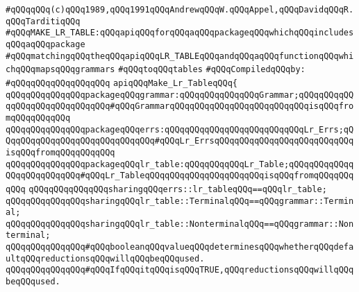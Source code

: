 \label{src/app/yacc/src/make-lr-table.api}
\verb|#qQQqqQQq(c)qQQq1989,qQQq1991qQQqAndrewqQQqW.qQQqAppel,qQQqDavidqQQqR.qQQqTarditiqQQq|\newline
\verb|#qQQqMAKE_LR_TABLE:qQQqapiqQQqforqQQqaqQQqpackageqQQqwhichqQQqincludesqQQqaqQQqpackage|\newline
\verb|#qQQqmatchingqQQqtheqQQqapiqQQqLR_TABLEqQQqandqQQqaqQQqfunctionqQQqwhichqQQqmapsqQQqgrammars|\newline
\verb|#qQQqtoqQQqtables|\newline
\newline
\verb|#qQQqCompiledqQQqby:|\newline
\verb|#qQQqqQQqqQQqqQQqqQQq|\newline
\newline
\verb|apiqQQqMake_Lr_TableqQQq{|\newline
\newline
\verb|qQQqqQQqqQQqqQQqpackageqQQqgrammar:qQQqqQQqqQQqqQQqGrammar;qQQqqQQqqQQqqQQqqQQqqQQqqQQqqQQq#qQQqGrammarqQQqqQQqqQQqqQQqqQQqqQQqqQQqisqQQqfromqQQqqQQqqQQq|\newline
\verb|qQQqqQQqqQQqqQQqpackageqQQqerrs:qQQqqQQqqQQqqQQqqQQqqQQqqQQqLr_Errs;qQQqqQQqqQQqqQQqqQQqqQQqqQQqqQQq#qQQqLr_ErrsqQQqqQQqqQQqqQQqqQQqqQQqqQQqisqQQqfromqQQqqQQqqQQq|\newline
\verb|qQQqqQQqqQQqqQQqpackageqQQqlr_table:qQQqqQQqqQQqLr_Table;qQQqqQQqqQQqqQQqqQQqqQQqqQQq#qQQqLr_TableqQQqqQQqqQQqqQQqqQQqqQQqisqQQqfromqQQqqQQqqQQq|\newline
\verb|qQQqqQQqqQQqqQQqsharingqQQqerrs::lr_tableqQQq==qQQqlr_table;|\newline
\newline
\verb|qQQqqQQqqQQqqQQqsharingqQQqlr_table::TerminalqQQq==qQQqgrammar::Terminal;|\newline
\verb|qQQqqQQqqQQqqQQqsharingqQQqlr_table::NonterminalqQQq==qQQqgrammar::Nonterminal;|\newline
\newline
\verb|qQQqqQQqqQQqqQQq#qQQqbooleanqQQqvalueqQQqdeterminesqQQqwhetherqQQqdefaultqQQqreductionsqQQqwillqQQqbeqQQqused.|\newline
\verb|qQQqqQQqqQQqqQQq#qQQqIfqQQqitqQQqisqQQqTRUE,qQQqreductionsqQQqwillqQQqbeqQQqused.|\newline

